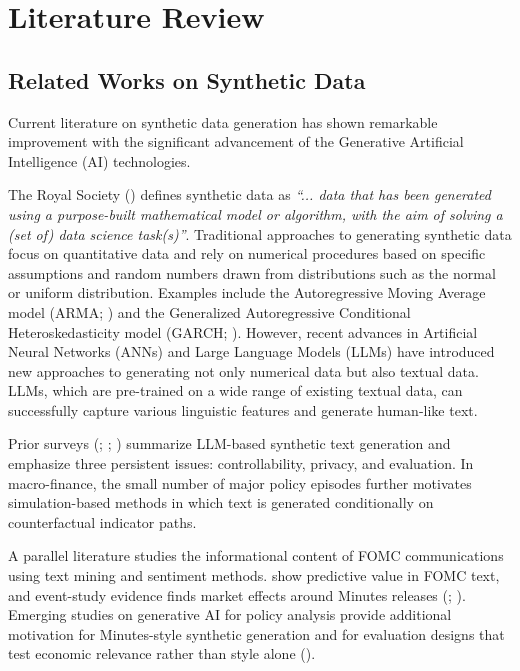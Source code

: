 \section{Literature Review}\label{ch2:sec:lr}

\subsection*{Related Works on Synthetic Data}\label{ch2:sec:lr:related work}
Current literature on synthetic data generation has shown remarkable improvement with the significant advancement of the Generative Artificial Intelligence (AI) technologies. 


The Royal Society (\cite{jordon2022synthetic}) defines synthetic data as \textit{``... data that has been generated using a purpose-built mathematical model or algorithm, with the aim of solving a (set of) data science task(s)''}. Traditional approaches to generating synthetic data focus on quantitative data and rely on numerical procedures based on specific assumptions and random numbers drawn from distributions such as the normal or uniform distribution. Examples include the Autoregressive Moving Average model (ARMA; \cite{whittle1951hypothesis}) and the Generalized Autoregressive Conditional Heteroskedasticity model (GARCH; \cite{Bollerslev:1986}). However, recent advances in Artificial Neural Networks (ANNs) and Large Language Models (LLMs) have introduced new approaches to generating not only numerical data but also textual data. LLMs, which are pre-trained on a wide range of existing textual data, can successfully capture various linguistic features and generate human-like text.



Prior surveys (\citet{potluru2023synthetic}; \citet{assefa2020generating}; \citet{guo2024generative}) summarize LLM-based synthetic text generation and emphasize three persistent issues: controllability, privacy, and evaluation. In macro-finance, the small number of major policy episodes further motivates simulation-based methods in which text is generated conditionally on counterfactual indicator paths.


A parallel literature studies the informational content of FOMC communications using text mining and sentiment methods. \citet{huang2021economic} show predictive value in FOMC text, and event-study evidence finds market effects around Minutes releases (\cite{jubinski2013fomc}; \cite{tadle2022fomc}). Emerging studies on generative AI for policy analysis provide additional motivation for Minutes-style synthetic generation and for evaluation designs that test economic relevance rather than style alone (\cite{dunn2024using}).

